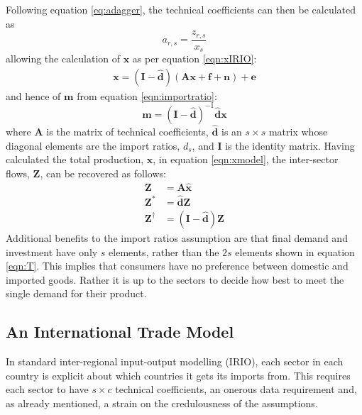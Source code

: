 \documentclass[a4paper]{article}
\begin{document}
Following equation \eqref{eq:adagger}, the technical coefficients can then be calculated as
\begin{equation}
a_{r,s} = \frac{z_{r,s}}{x_s}
\end{equation}
allowing the calculation of $\boldsymbol{x}$ as per equation \eqref{eqn:xIRIO}:
\begin{align}
\boldsymbol{x} 
= 
(\boldsymbol{I} - \boldsymbol{\hat{d}})
(
\boldsymbol{Ax} + 
\boldsymbol{f} + \boldsymbol{n}
)
+ \boldsymbol{e}
\label{eqn:xmodel}
\end{align}
and hence of $\boldsymbol{m}$ from equation \eqref{eqn:importratio}:
\begin{equation}
\boldsymbol{m} = 
(\boldsymbol{I} - 
\boldsymbol{\hat{d}})^{-1} 
\boldsymbol{\hat{d}}\boldsymbol{x}\label{eqn:mmodel}
\end{equation}
where $\boldsymbol{A}$ is the matrix of technical coefficients, $\boldsymbol{\hat{d}}$ is an $s \times s$ matrix whose diagonal elements are the import ratios, $d_s$, and $\boldsymbol{I}$ is the identity matrix.
Having calculated the total production, $\boldsymbol{x}$, in equation \eqref{eqn:xmodel}, the inter-sector flows, $\boldsymbol{Z}$, can be recovered as follows:
\begin{align}
\boldsymbol{Z}& = \boldsymbol{A}\boldsymbol{\hat{x}}\nonumber\\
\boldsymbol{Z^*}& = \boldsymbol{\hat{d}}\boldsymbol{Z}\\
\boldsymbol{Z^\dagger}& = (\boldsymbol{I} - \boldsymbol{\hat{d}})
	\boldsymbol{Z}\label{eqn:zstar}
\end{align}
Additional benefits to the import ratios assumption are that final demand and investment have only $s$ elements, rather than the $2s$ elements shown in equation \eqref{eqn:T}.
This implies that consumers have no preference between domestic and imported goods.
Rather it is up to the sectors to decide how best to meet the single demand for their product.

\subsection{An International Trade Model}\label{sec:trade}
In standard inter-regional input-output modelling (IRIO), each sector in each country is explicit about which countries it gets its imports from. 
This requires each sector to have $s \times c$ technical coefficients, an onerous data requirement and, as already mentioned, a strain on the credulousness of the assumptions. 
\end{document}
